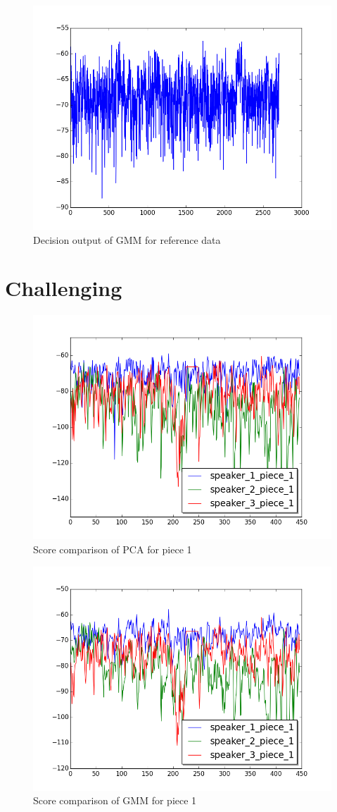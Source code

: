 \documentclass[magister]{dyplom}
\begin{document}
	\begin{figure}[th!]
		\centering
		\includegraphics[width=0.5\linewidth]{images/simulation/ADJ_002_GMM_decision_output}
		\caption{Decision output of \gls{GMM} for reference data}
		\label{fig:ADJ_002_GMM_decision_output}
	\end{figure}

	
	\section{Challenging} \label{sec:challenging}
	
	\begin{figure}[th!]
		\centering
		\includegraphics[width=0.7\linewidth]{"images/simulation/CHL_001_piece_1_score of PCA"}
		\caption{Score comparison of \gls{PCA} for piece 1}
		\label{fig:CHL_001_piece_1_scoreofPCA}
	\end{figure}
	
	\begin{figure}[th!]
		\centering
		\includegraphics[width=0.7\linewidth]{"images/simulation/CHL_002_piece_1_score of GMM"}
		\caption{Score comparison of \gls{GMM} for piece 1}
		\label{fig:CHL_002_piece_1_scoreofGMM}
	\end{figure}
	
\end{document}
